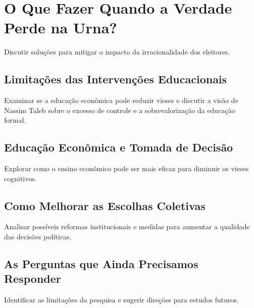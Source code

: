 

\chapter{O Que Fazer Quando a Verdade Perde na Urna?} %

Discutir soluções para mitigar o impacto da irracionalidade dos eleitores.

\section{Limitações das Intervenções Educacionais} %

Examinar se a educação econômica pode reduzir vieses e discutir a visão de Nassim Taleb sobre o excesso de controle e a sobrevalorização da educação formal.

\section{Educação Econômica e Tomada de Decisão} %

Explorar como o ensino econômico pode ser mais eficaz para diminuir os vieses cognitivos.

\section{Como Melhorar as Escolhas Coletivas} %

Analisar possíveis reformas institucionais e medidas para aumentar a qualidade das decisões políticas.

\section{As Perguntas que Ainda Precisamos Responder} %

Identificar as limitações da pesquisa e sugerir direções para estudos futuros.
